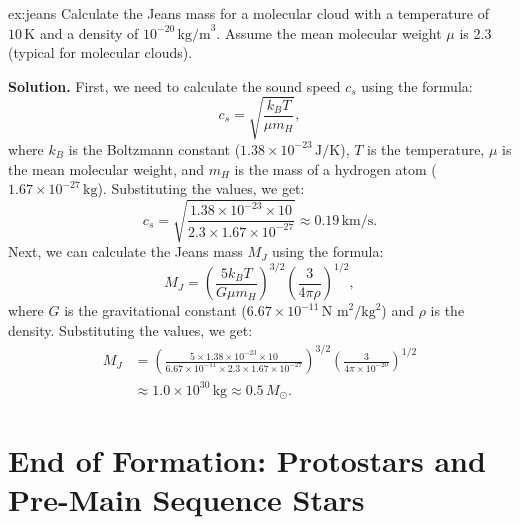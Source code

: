 \begin{example}{}{ex:jeans}
Calculate the Jeans mass for a molecular cloud with a temperature of $10\,\text{K}$ and a density of $10^{-20}\,\text{kg/m}^3$. Assume the mean molecular weight $\mu$ is 2.3 (typical for molecular clouds).   

\smallskip\textbf{Solution.}
First, we need to calculate the sound speed $c_s$ using the formula:
\begin{equation}
c_s = \sqrt{\frac{k_B T}{\mu m_H}},
\end{equation}
where $k_B$ is the Boltzmann constant ($1.38 \times 10^{-23}\,\text{J/K}$), $T$ is the temperature, $\mu$ is the mean molecular weight, and $m_H$ is the mass of a hydrogen atom ($1.67 \times 10^{-27}\,\text{kg}$).
Substituting the values, we get:
\begin{equation}
c_s = \sqrt{\frac{1.38 \times 10^{-23} \times 10}{2.3 \times 1.67 \times 10^{-27}}} \approx 0.19\,\text{km/s}.
\end{equation}
Next, we can calculate the Jeans mass $M_J$ using the formula:
\begin{equation}    
M_J = \left(\frac{5k_B T}{G\mu m_H}\right)^{3/2}\left(\frac{3}{4\pi\rho}\right)^{1/2},
\end{equation}
where $G$ is the gravitational constant ($6.67 \times 10^{-11}\,\text{N m}^2/\text{kg}^2$) and $\rho$ is the density. Substituting the values, we get:
\begin{align}
M_J &= \left(\frac{5 \times 1.38 \times 10^{-23} \times 10}{6.67 \times 10^{-11} \times 2.3 \times 1.67 \times 10^{-27}}\right)^{3/2}\left(\frac{3}{4\pi \times 10^{-20}}\right)^{1/2} \\
&\approx 1.0 \times 10^{30}\,\text{kg} \approx 0.5\,M_\odot.
\end{align}
\end{example}


\section{End of Formation: Protostars and Pre-Main Sequence Stars}

